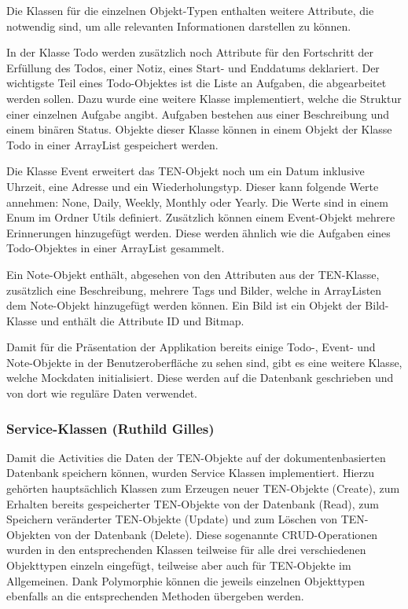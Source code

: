 Die Klassen für die einzelnen Objekt-Typen enthalten weitere Attribute, die notwendig sind, um alle relevanten Informationen darstellen zu können.

In der Klasse Todo werden zusätzlich noch Attribute für den Fortschritt der Erfüllung des Todos, einer Notiz, eines Start- und Enddatums deklariert. Der wichtigste Teil eines Todo-Objektes ist die Liste an Aufgaben, die abgearbeitet werden sollen. Dazu wurde eine weitere Klasse implementiert, welche die Struktur einer einzelnen Aufgabe angibt. Aufgaben bestehen aus einer Beschreibung und einem binären Status. Objekte dieser Klasse können in einem Objekt der Klasse Todo in einer ArrayList gespeichert werden.

Die Klasse Event erweitert das TEN-Objekt noch um ein Datum inklusive Uhrzeit, eine Adresse und ein Wiederholungstyp. Dieser kann folgende Werte annehmen: None, Daily, Weekly, Monthly oder Yearly. Die Werte sind in einem Enum im Ordner Utils definiert. Zusätzlich können einem Event-Objekt mehrere Erinnerungen hinzugefügt werden. Diese werden ähnlich wie die Aufgaben eines Todo-Objektes in einer ArrayList gesammelt.

Ein Note-Objekt enthält, abgesehen von den Attributen aus der TEN-Klasse, zusätzlich eine Beschreibung, mehrere Tags und Bilder, welche in ArrayListen dem Note-Objekt hinzugefügt werden können. Ein Bild ist ein Objekt der Bild-Klasse und enthält die Attribute ID und Bitmap.

Damit für die Präsentation der Applikation bereits einige Todo-, Event- und Note-Objekte in der Benutzeroberfläche zu sehen sind, gibt es eine weitere Klasse, welche Mockdaten initialisiert. Diese werden auf die Datenbank geschrieben und von dort wie reguläre Daten verwendet.

\subsubsection{Service-Klassen (Ruthild Gilles)}

Damit die Activities die Daten der TEN-Objekte auf der dokumentenbasierten Datenbank speichern können, wurden Service Klassen implementiert. Hierzu gehörten hauptsächlich Klassen zum Erzeugen neuer TEN-Objekte (Create), zum Erhalten bereits gespeicherter TEN-Objekte von der Datenbank (Read), zum Speichern veränderter TEN-Objekte (Update) und zum Löschen von TEN-Objekten von der Datenbank (Delete). Diese sogenannte CRUD-Operationen wurden in den entsprechenden Klassen teilweise für alle drei verschiedenen Objekttypen einzeln eingefügt, teilweise aber auch für TEN-Objekte im Allgemeinen. Dank Polymorphie können die jeweils einzelnen Objekttypen ebenfalls an die entsprechenden Methoden übergeben werden.

